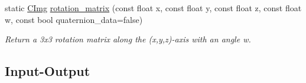 \begin{DoxyCompactItemize}
\item 
\hypertarget{structcimg__library_1_1_c_img_a70c96fae54ed1d36114917d5fe1072bf}{
static \hyperlink{structcimg__library_1_1_c_img}{CImg} \hyperlink{structcimg__library_1_1_c_img_a70c96fae54ed1d36114917d5fe1072bf}{rotation\_\-matrix} (const float x, const float y, const float z, const float w, const bool quaternion\_\-data=false)}
\label{structcimg__library_1_1_c_img_a70c96fae54ed1d36114917d5fe1072bf}

\begin{DoxyCompactList}\small\item\em Return a 3x3 rotation matrix along the (x,y,z)-\/axis with an angle w. \item\end{DoxyCompactList}\end{DoxyCompactItemize}
\subsection*{Input-\/Output}
\label{_amgrp2c0f14b4c93b1375c8f5569590de3905}
